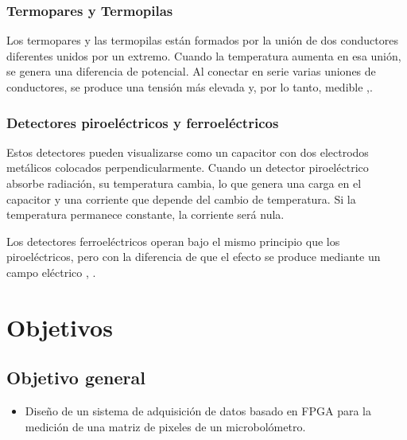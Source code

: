 		\subsubsection{Termopares y Termopilas}
		Los termopares y las termopilas están formados por la unión de dos conductores diferentes unidos por un extremo. Cuando la temperatura aumenta en esa unión, se genera una diferencia de potencial. Al conectar en serie varias uniones de conductores, se produce una tensión más elevada y, por lo tanto, medible \cite{Rogalski},\cite{Vincent}.
		
		\subsubsection{Detectores piroeléctricos y ferroeléctricos}
		Estos detectores pueden visualizarse como un capacitor con dos electrodos metálicos colocados perpendicularmente. Cuando un detector piroeléctrico absorbe radiación, su temperatura cambia, lo que genera una carga en el capacitor y una corriente que depende del cambio de temperatura. Si la temperatura permanece constante, la corriente será nula.

Los detectores ferroeléctricos operan bajo el mismo principio que los piroeléctricos, pero con la diferencia de que el efecto se produce mediante un campo eléctrico \cite{Rogalski}, \cite{BlancoMDA}.
		
    \lipsum[1] 					          
		
    \section{Objetivos}
	
		\subsection{Objetivo general}
			\begin{itemize}
				\item Diseño de un sistema de adquisición de datos basado en FPGA para la medición de una matriz de pixeles de un microbolómetro.
			\end{itemize}
		

